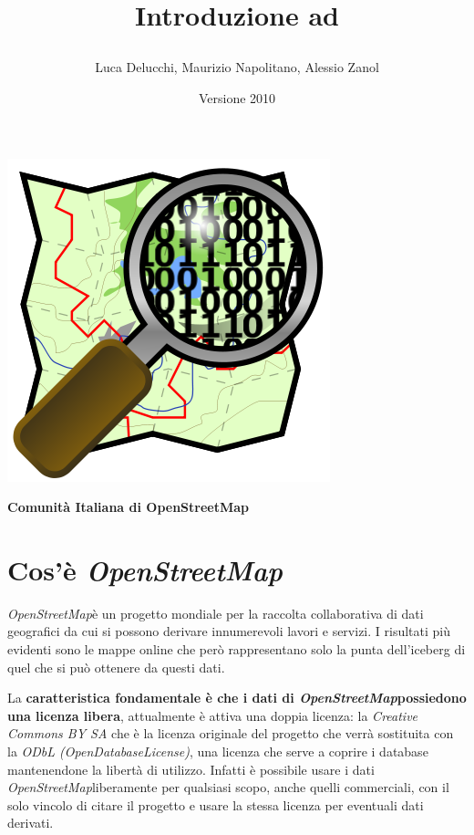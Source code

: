 \documentclass[a4paper,twoside,12pt,]{article}
\title{\begin{Large}Introduzione ad \osm\end{Large}}
\date{\small{Versione 2010}}
\author{Luca Delucchi, Maurizio Napolitano, Alessio Zanol}
\newcommand{\osm}{\emph{OpenStreetMap\xspace}}
\begin{document}
\maketitle
\begin{center}
\includegraphics{Openstreetmap.png}
\end{center}
\begin{center}
	\begin{large}
	\textbf{Comunità Italiana di OpenStreetMap}
	\end{large}
\end{center}
\newpage

\section{Cos'è \osm}
\osm è un progetto mondiale per la raccolta collaborativa di dati geografici da cui si possono derivare innumerevoli lavori e servizi. I risultati più evidenti sono le mappe online che però rappresentano solo la punta dell'iceberg di quel che si può ottenere da questi dati.

La \textbf{caratteristica fondamentale è che i dati di \osm possiedono una licenza libera}, attualmente è attiva una doppia licenza: la \emph{Creative Commons BY SA} che è la licenza originale del progetto che verrà sostituita con la \emph{ODbL (OpenDatabaseLicense)}, una licenza che serve a coprire i database mantenendone la libertà di utilizzo. Infatti è possibile usare i dati \osm liberamente per qualsiasi scopo, anche quelli commerciali, con il solo vincolo di citare il progetto e usare la stessa licenza per eventuali dati derivati. 
\end{document}
